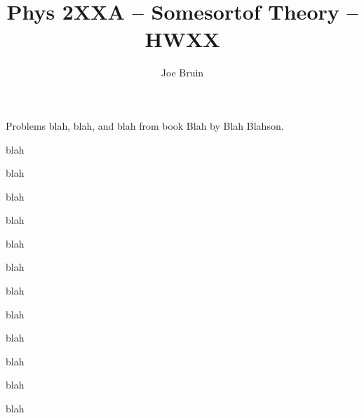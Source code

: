 \documentclass[12pt]{article} %
\title{Phys 2XXA -- Somesortof Theory -- HWXX}
\author{Joe Bruin}
\date{\formatdate{01}{04}{2015}} %
\begin{document}
\maketitle



\begin{em}
Problems blah, blah, and blah from book Blah by Blah Blahson.
\end{em}




\sectionproblem%
\begin{em}
blah
\end{em}


\begin{enumproblem}

\item \begin{em}
blah
\end{em}

blah


\item \begin{em}
blah
\end{em}

blah


\item \begin{em}
blah
\end{em}

blah


\item \begin{em}
blah
\end{em}

blah


\item \begin{em}
blah
\end{em}

blah


\end{enumproblem}




\sectionproblem%
\begin{em}
blah
\end{em}
\end{document}
